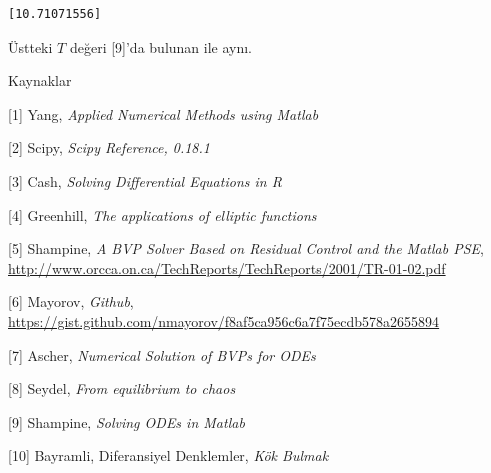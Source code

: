 \documentclass[12pt,fleqn]{article}\usepackage{../../common}
\begin{document}
\begin{verbatim}
[10.71071556]
\end{verbatim}

Üstteki $T$ değeri [9]'da bulunan ile aynı. 

Kaynaklar

[1] Yang, {\em Applied Numerical Methods using Matlab}

[2] Scipy, {\em Scipy Reference, 0.18.1}

[3] Cash, {\em Solving Differential Equations in R}

[4] Greenhill, {\em The applications of elliptic functions}

[5] Shampine, {\em A BVP Solver Based on Residual Control and the Matlab PSE}, 
    \url{http://www.orcca.on.ca/TechReports/TechReports/2001/TR-01-02.pdf}

[6] Mayorov, {\em Github}, \url{https://gist.github.com/nmayorov/f8af5ca956c6a7f75ecdb578a2655894}

[7] Ascher, {\em Numerical Solution of BVPs for ODEs}

[8] Seydel, {\em From equilibrium to chaos}

[9] Shampine, {\em Solving ODEs in Matlab}

[10] Bayramli, Diferansiyel Denklemler, {\em Kök Bulmak}
    
\end{document}
